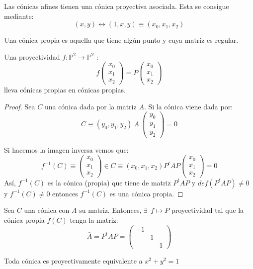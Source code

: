 \begin{nprop}
	Las cónicas afines tienen una cónica proyectiva asociada. Esta se consigue mediante:
	\[
	(x,y) \leftrightarrow (1,x,y) \equiv (x_0, x_1,x_2)
	\]
\end{nprop}

\begin{ndef}
	Una cónica propia es aquella que tiene algún punto y cuya matriz es regular.
\end{ndef}

\begin{nth}
	Una proyectividad $f:\mathbb P^2 \to \mathbb P^2$ :
	\[
	f \begin{pmatrix}
x_0\\
x_1\\
x_2
\end{pmatrix} = P \begin{pmatrix}
x_0\\
x_1\\
x_2
\end{pmatrix}
	\]
	lleva cónicas propias en cónicas propias.
\end{nth}
\begin{proof}
	Sea $C$ una cónica dada por la matriz $A$. Si la cónica viene dada por:
	\[
	C \equiv (y_0,y_1,y_2) \ A \ \begin{pmatrix}
y_0\\
y_1\\
y_2
\end{pmatrix} = 0
	\]

	 Si hacemos la imagen inversa vemos que:
	\[
	f^{-1}(C) \equiv \begin{pmatrix}
x_0\\
x_1\\
x_2
\end{pmatrix} \in C \equiv (x_0, x_1,x_2) P^t A P \begin{pmatrix}
x_0\\
x_1\\
x_2
\end{pmatrix} = 0
	\]
	Así, $f^{-1}(C)$ es la cónica (propia) que tiene de matriz $P^t A P$ y $def(P^t A P) \ne 0$ y $f^{-1}(C) \ne 0$ entonces $f^{-1}(C)$ es una cónica propia.
\end{proof}

\begin{nth}
	Sea $C$ una cónica con $A$ su matriz. Entonces, $\exists  \ \ f \mapsto P $ proyectividad tal que la cónica propia $f(C)$ tenga la matriz:
	\[
	\bar A = P^t A P=\begin{pmatrix}
-1& & \\
& 1& \\
& & 1
\end{pmatrix}
	\]
\end{nth}
\begin{ncor}
	Toda cónica es proyectivamente equivalente a $x^2 +y^2 = 1$
\end{ncor}


